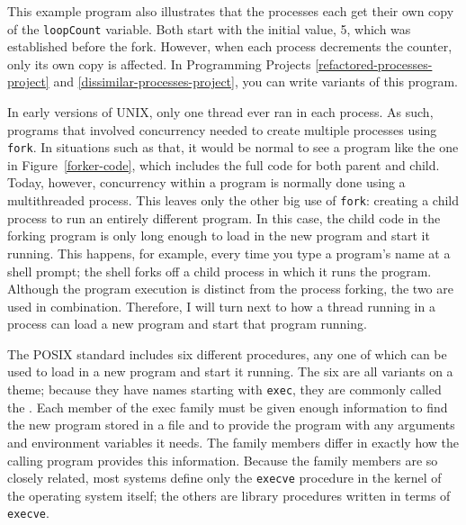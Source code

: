 This example program also illustrates that the
processes each get their own copy of the \verb|loopCount| variable.
Both start with the initial value, 5, which was established before the
fork.  However, when each process decrements the counter, only its own
copy is affected.    In Programming Projects \ref{refactored-processes-project} and
\ref{dissimilar-processes-project}, you can write variants of this program.

In early versions of UNIX, only one thread ever ran in each process.
As such, programs that involved concurrency needed to create multiple
processes using \verb|fork|.  In situations such as that, it would be
normal to see a program like the one in Figure~\ref{forker-code}, which includes the full code
for both parent and child.  Today, however, concurrency within a
program is normally done using a multithreaded process.  This leaves
only the other big use of \verb|fork|: creating a child process to run
an entirely different program.  In this case, the child code in the
forking program is only long enough to load in the new program and
start it running.  This happens, for example, every time you type a
program's name at a shell prompt; the shell forks off a child process
in which it runs the program.  Although the program execution is
distinct from the process forking, the two are used in combination.
Therefore, I will turn next to how a thread running in a process can
load a new program and start that program running.

The POSIX standard includes six different procedures, any one of which
can be used to load in a new program and start it running.  The six
are all variants on a theme; because they have names starting with
\verb|exec|, they are commonly called the .  Each
member of the exec family must be given enough information to find the
new program stored in a file and to provide the program with any
arguments and environment variables it needs.  The family members
differ in exactly how the calling program provides this information.
Because the family members are so closely related, most systems define
only the \verb|execve| procedure in the kernel
of the operating system itself; the others are library procedures
written in terms of \verb|execve|.

